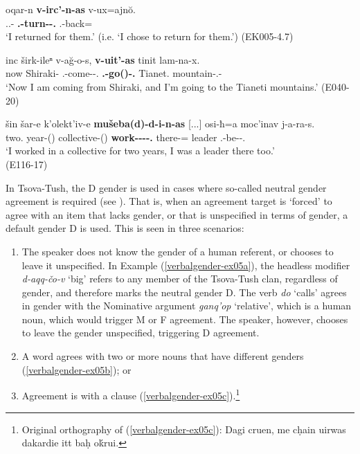 \begin{exe}
	\ex\label{verbalgender-ex03}
	\begin{xlist}
		
		\ex\label{verbalgender-ex03a}
		\gll oqar-n \textbf{v-irc'-n-as} v-ux=ajn\u{o}. \\
		{\Dist}.{\Pl}.{\Obl}-{\Dat} \textbf{{\M}.{\Sg}-turn-{\Aor}-{\Fsg}.{\Erg}} {\M}.{\Sg}-back={\Quot} \\
		\trans `I returned for them.' (i.e. `I chose to return for them.')
		\hfill (EK005-4.7)
		
		
		\ex\label{verbalgender-ex03b}
		\gll inc širk-ileⁿ v-a\u{g}-o-s, \textbf{v-uit'-as} tinit lam-na-x. \\
		now Shiraki-{\Elat} {\M}.{\Sg}-come-{\Npst}-{\Fsg}.{\Erg} \textbf{{\M}.{\Sg}-go({\Npst})-{\Fsg}.{\Erg}} Tianet.{\Ill} mountain-{\Obl}.{\Pl}-{\Cont} \\
		\trans `Now I am coming from Shiraki, and I'm going to the Tianeti mountains.'
		\hfill (E040-20)
		
		\ex\label{verbalgender-ex03c}
		\gll šin šar-e k'olekt'iv-e \textbf{mušeba(d)-d-i-n-as} [...] osi-ħ=a moc'inav j-a-ra-s. \\
		two.{\Obl} year-{\Obl}({\Ess}) collective-{\Obl}({\Ess}) \textbf{work-{\D}-{\Tr}-{\Aor}-{\Fsg}.{\Erg}} {} there-{\Ess}={\Add} leader {\F}.{\Sg}-be-{\Imprf}-{\Fsg}.{\Nom} \\
		\trans `I worked in a collective for two years, I was a leader there too.' \\
		\hfill (E116-17)
		
	\end{xlist}
\end{exe}

In Tsova-Tush, the D gender is used in cases where so-called neutral gender agreement is required (see \cites[205]{corbett91}). That is, when an agreement target is `forced' to agree with an item that lacks gender, or that is unspecified in terms of gender, a default gender D is used. This is seen in three scenarios:\largerpage

\begin{enumerate}
	\item The speaker does not know the gender of a human referent, or chooses to leave it unspecified. In Example (\ref{verbalgender-ex05a}), the headless modifier \textit{d-aqq-čo-v} `big' refers to any member of the Tsova-Tush clan, regardless of gender, and therefore marks the neutral gender D. The verb \textit{do} `calls' agrees in gender with the Nominative argument \textit{ganq'op} `relative', which is a human noun, which would trigger M or F agreement. The speaker, however, chooses to leave the gender unspecified, triggering D agreement.
	
	\item A word agrees with two or more nouns that have different genders (\ref{verbalgender-ex05b}); or
	
	\item Agreement is with a clause (\ref{verbalgender-ex05c}).\footnote{Original orthography of (\ref{verbalgender-ex05c}): Dagi cruen, me cḥain uirwas dakardie itt baḥ o\'{k}rui.}
\end{enumerate}


